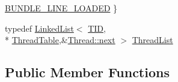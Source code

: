 \begin{DoxyCompactItemize}
\hyperlink{class_simulator_1_1drisc_1_1_allocator_a411b852f8de6fe3d7c8223ecc6966802a69070d18633adbc60c5e43cdfd0872e0}{B\+U\+N\+D\+L\+E\+\_\+\+L\+I\+N\+E\+\_\+\+L\+O\+A\+D\+E\+D}
 \}
\item 
typedef \hyperlink{class_simulator_1_1_linked_list}{Linked\+List}$<$ \hyperlink{namespace_simulator_a483cc4ecee1736e895054617672cded5}{T\+I\+D}, \\*
\hyperlink{class_simulator_1_1drisc_1_1_thread_table}{Thread\+Table},\&\hyperlink{struct_simulator_1_1drisc_1_1_thread_acbfe721255a13b2fd1d188225ea29b99}{Thread\+::next} $>$ \hyperlink{class_simulator_1_1drisc_1_1_allocator_acee4df99e4e6a73556f46dd8ad5aa6e1}{Thread\+List}
\end{DoxyCompactItemize}
\subsection*{Public Member Functions}
